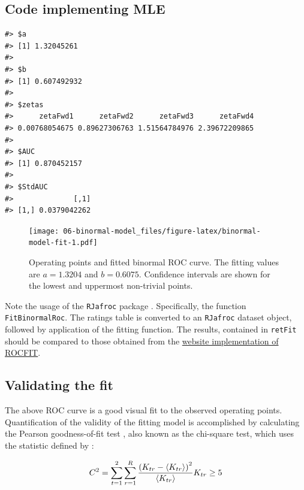 \documentclass[
]{book}
\begin{document}
\hypertarget{code-implementing-mle}{%
\subsection{Code implementing MLE}\label{code-implementing-mle}}

\begin{verbatim}
#> $a
#> [1] 1.32045261
#> 
#> $b
#> [1] 0.607492932
#> 
#> $zetas
#>      zetaFwd1      zetaFwd2      zetaFwd3      zetaFwd4 
#> 0.00768054675 0.89627306763 1.51564784976 2.39672209865 
#> 
#> $AUC
#> [1] 0.870452157
#> 
#> $StdAUC
#>              [,1]
#> [1,] 0.0379042262
\end{verbatim}

\begin{figure}
\centering
\texttt{[image: 06-binormal-model\_files/figure-latex/binormal-model-fit-1.pdf]}
\caption{\label{fig:binormal-model-fit}Operating points and fitted binormal ROC curve. The fitting values are \(a = 1.3204\) and \(b = 0.6075\). Confidence intervals are shown for the lowest and uppermost non-trivial points.}
\end{figure}

Note the usage of the \texttt{RJafroc} package \citep{R-RJafroc}. Specifically, the function \texttt{FitBinormalRoc}. The ratings table is converted to an \texttt{RJafroc} dataset object, followed by application of the fitting function. The results, contained in \texttt{retFit} should be compared to those obtained from the \href{http://www.rad.jhmi.edu/jeng/javarad/roc/JROCFITi.html}{website implementation of ROCFIT}.

\hypertarget{binormal-model-curve-fitting-validation}{%
\subsection{Validating the fit}\label{binormal-model-curve-fitting-validation}}

The above ROC curve is a good visual fit to the observed operating points. Quantification of the validity of the fitting model is accomplished by calculating the Pearson goodness-of-fit test \citep{RN2656}, also known as the chi-square test, which uses the statistic defined by \citep{larsen2005introduction}:

\begin{equation} 
C^2=\sum_{t=1}^{2}\sum_{r=1}^{R}\frac{\left (K_{tr}-\left \langle K_{tr} \right \rangle  \right )^2}{\left \langle K_{tr} \right \rangle}\\
K_{tr} \geq 5
\label{eq:binormal-modelGoodnessFit}
\end{equation}
\end{document}
